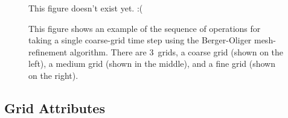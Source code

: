 \documentclass{article}
\begin{document}
\begin{figure}[bp]
\begin{center}
\vspace{35mm}
This figure doesn't exist yet. :(
\vspace{35mm}
\end{center}
\caption[The Berger-Oliger Algorithm]
	{
	This figure shows an example of the sequence of operations
	for taking a single coarse-grid time step using the Berger-Oliger
	mesh-refinement algorithm.
	There are 3~grids, a coarse grid (shown on the left),
	a medium grid (shown in the middle), and a fine grid
	(shown on the right).
	}
\label{fig-Berger-Oliger-algorithm}
\end{figure}


\subsection{Grid Attributes}
\end{document}
